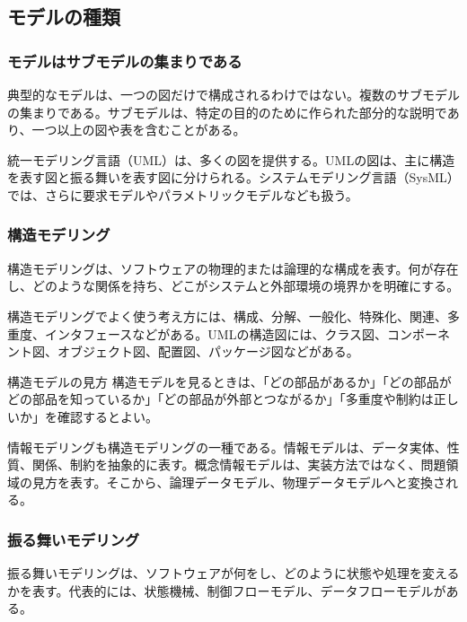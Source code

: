 \subsection{モデルの種類}
\subsubsection{モデルはサブモデルの集まりである}
典型的なモデルは、一つの図だけで構成されるわけではない。複数のサブモデルの集まりである。サブモデルは、特定の目的のために作られた部分的な説明であり、一つ以上の図や表を含むことがある。

統一モデリング言語（UML）は、多くの図を提供する。UMLの図は、主に構造を表す図と振る舞いを表す図に分けられる。システムモデリング言語（SysML）では、さらに要求モデルやパラメトリックモデルなども扱う。

\subsubsection{構造モデリング}
構造モデリングは、ソフトウェアの物理的または論理的な構成を表す。何が存在し、どのような関係を持ち、どこがシステムと外部環境の境界かを明確にする。

構造モデリングでよく使う考え方には、構成、分解、一般化、特殊化、関連、多重度、インタフェースなどがある。UMLの構造図には、クラス図、コンポーネント図、オブジェクト図、配置図、パッケージ図などがある。

\begin{pointbox}{構造モデルの見方}
構造モデルを見るときは、「どの部品があるか」「どの部品がどの部品を知っているか」「どの部品が外部とつながるか」「多重度や制約は正しいか」を確認するとよい。
\end{pointbox}

情報モデリングも構造モデリングの一種である。情報モデルは、データ実体、性質、関係、制約を抽象的に表す。概念情報モデルは、実装方法ではなく、問題領域の見方を表す。そこから、論理データモデル、物理データモデルへと変換される。

\subsubsection{振る舞いモデリング}
振る舞いモデリングは、ソフトウェアが何をし、どのように状態や処理を変えるかを表す。代表的には、状態機械、制御フローモデル、データフローモデルがある。

